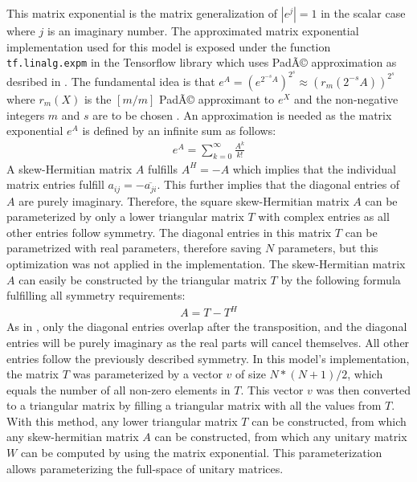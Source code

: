 \documentclass[draft,final]{vutinfth} %
\begin{document}
    This matrix exponential is the matrix generalization of $|e^j|=1$ in the scalar case where $j$ is an imaginary number.
    The approximated matrix exponential implementation used for this model is exposed under the function \texttt{tf.linalg.expm} in the Tensorflow library \cite{Tensorflow} which uses PadÃ© approximation as desribed in \cite{expm}.
    The fundamental idea is that $e^A = (e^{2^{-s}A})^{2^s} \approx (r_m(2^{-s}A))^{2^s}$ where $r_m(X)$ is the $[m/m]$ PadÃ© approximant to $e^X$ and the non-negative integers $m$ and $s$ are to be chosen \cite[p. 1]{expm}.
    An approximation is needed as the matrix exponential $e^A$ is defined by an infinite sum as follows:
    \begin{align}
        \label{expm_definition}
        e^A = \sum_{k=0}^{\infty} \frac{A^k}{k!}
    \end{align}
    A skew-Hermitian matrix $A$ fulfills $A^H = -A$ which implies that the individual matrix entries fulfill $a_{ij} = -\overline{a_{ji}}$.
    This further implies that the diagonal entries of $A$ are purely imaginary.
    Therefore, the square skew-Hermitian matrix $A$ can be parameterized by only a lower triangular matrix $T$ with complex entries as all other entries follow symmetry.
    The diagonal entries in this matrix $T$ can be parametrized with real parameters, therefore saving $N$ parameters, but this optimization was not applied in the implementation.
    The skew-Hermitian matrix $A$ can easily be constructed by the triangular matrix $T$ by the following formula fulfilling all symmetry requirements:
    \begin{align}
        \label{skew_hermitian}
        A = T - T^H
    \end{align}
    As in , only the diagonal entries overlap after the transposition, and the diagonal entries will be purely imaginary as the real parts will cancel themselves.
    All other entries follow the previously described symmetry.
    In this model's implementation, the matrix $T$ was parameterized by a vector $v$ of size $N*(N+1)/2$, which equals the number of all non-zero elements in $T$.
    This vector $v$ was then converted to a triangular matrix by filling a triangular matrix with all the values from $T$.
    With this method, any lower triangular matrix $T$ can be constructed, from which any skew-hermitian matrix $A$ can be constructed, from which any unitary matrix $W$ can be computed by using the matrix exponential.
    This parameterization allows parameterizing the full-space of unitary matrices.
\end{document}
